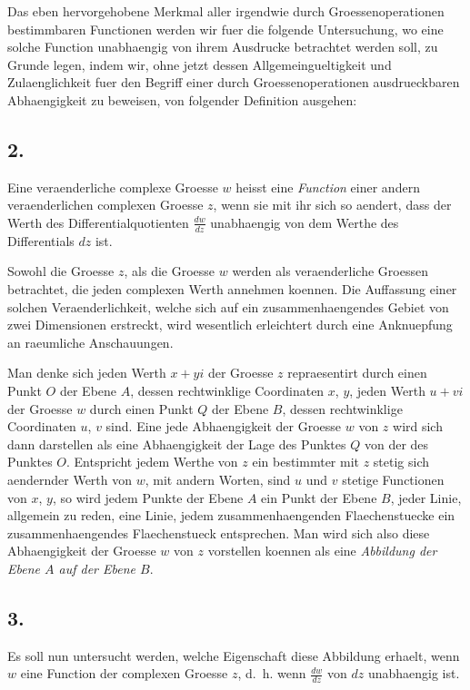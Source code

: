 \documentclass[12pt,a4paper]{book}
\theoremstyle{definition}
\theoremstyle{remark}
\begin{document}
Das eben hervorgehobene Merkmal aller irgendwie durch Groessenoperationen bestimmbaren Functionen werden wir fuer die folgende Untersuchung, wo eine solche Function unabhaengig von ihrem Ausdrucke betrachtet werden soll, zu Grunde legen, indem wir, ohne jetzt dessen Allgemeingueltigkeit und Zulaenglichkeit fuer den Begriff einer durch Groessenoperationen ausdrueckbaren Abhaengigkeit zu beweisen, von folgender Definition ausgehen:

\subsection*{2.}

Eine veraenderliche complexe Groesse $w$ heisst eine \emph{Function} einer andern veraenderlichen complexen Groesse $z$, wenn sie mit ihr sich so aendert, dass der Werth des Differentialquotienten $\frac{dw}{dz}$ unabhaengig von dem Werthe des Differentials $dz$ ist.

Sowohl die Groesse $z$, als die Groesse $w$ werden als veraenderliche Groessen betrachtet, die jeden complexen Werth annehmen koennen. Die Auffassung einer solchen Veraenderlichkeit, welche sich auf ein zusammenhaengendes Gebiet von zwei Dimensionen erstreckt, wird wesentlich erleichtert durch eine Anknuepfung an raeumliche Anschauungen.

Man denke sich jeden Werth $x + yi$ der Groesse $z$ repraesentirt durch einen Punkt $O$ der Ebene $A$, dessen rechtwinklige Coordinaten $x$, $y$, jeden Werth $u + vi$ der Groesse $w$ durch einen Punkt $Q$ der Ebene $B$, dessen rechtwinklige Coordinaten $u$, $v$ sind. Eine jede Abhaengigkeit der Groesse $w$ von $z$ wird sich dann darstellen als eine Abhaengigkeit der Lage des Punktes $Q$ von der des Punktes $O$. Entspricht jedem Werthe von $z$ ein bestimmter mit $z$ stetig sich aendernder Werth von $w$, mit andern Worten, sind $u$ und $v$ stetige Functionen von $x$, $y$, so wird jedem Punkte der Ebene $A$ ein Punkt der Ebene $B$, jeder Linie, allgemein zu reden, eine Linie, jedem zusammenhaengenden Flaechenstuecke ein zusammenhaengendes Flaechenstueck entsprechen. Man wird sich also diese Abhaengigkeit der Groesse $w$ von $z$ vorstellen koennen als eine \emph{Abbildung der Ebene $A$ auf der Ebene $B$}.

\subsection*{3.}

Es soll nun untersucht werden, welche Eigenschaft diese Abbildung erhaelt, wenn $w$ eine Function der complexen Groesse $z$, d.\ h. wenn $\frac{dw}{dz}$ von $dz$ unabhaengig ist.
\end{document}
